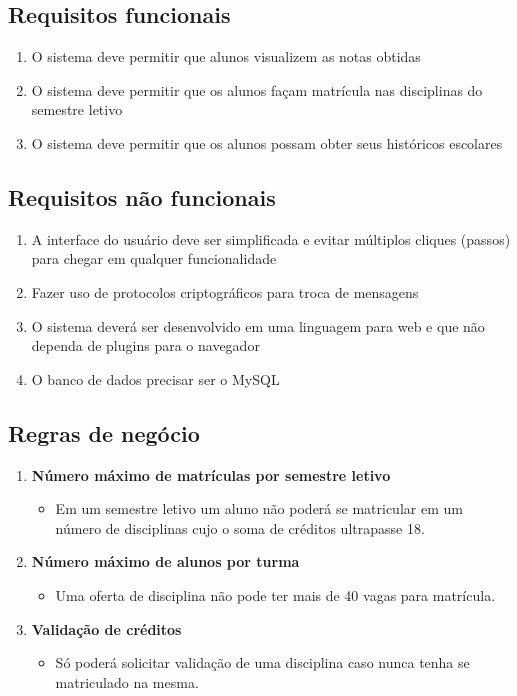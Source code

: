 \documentclass[11pt]{ifscarticle}
\begin{document}
\lipsum[2]


\subsection{Requisitos funcionais}\label{sec:reqfuncionais}

\begin{enumerate}
    \item O sistema deve permitir que alunos visualizem as notas obtidas
    \item O sistema deve permitir que os alunos façam matrícula nas disciplinas do semestre letivo
    \item O sistema deve permitir que os alunos possam obter seus históricos escolares
\end{enumerate}

\subsection{Requisitos não funcionais}\label{sec:reqnaofuncionais}

\begin{enumerate}
    \item A interface do usuário deve ser simplificada e evitar múltiplos cliques (passos) para chegar em qualquer funcionalidade
    \item Fazer uso de protocolos criptográficos para troca de mensagens
    \item O sistema deverá ser desenvolvido em uma linguagem para web e que não dependa de plugins para o navegador
    \item O banco de dados precisar ser o MySQL
\end{enumerate}

\subsection{Regras de negócio}\label{sec:regrasdenegocio}

\begin{enumerate}
    \item \textbf{Número máximo de matrículas por semestre letivo}
    \begin{itemize}
        \item Em um semestre letivo um aluno não poderá se matricular em um número de disciplinas cujo o soma de créditos ultrapasse 18.
    \end{itemize}
    \item \textbf{Número máximo de alunos por turma}
    \begin{itemize}
        \item Uma oferta de disciplina não pode ter mais de 40 vagas para matrícula.
    \end{itemize}
    \item \textbf{Validação de créditos}
    \begin{itemize}
        \item Só poderá solicitar validação de uma disciplina caso nunca tenha se matriculado na mesma.
    \end{itemize}
\end{enumerate}
\end{document}
